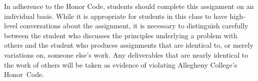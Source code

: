 In adherence to the Honor Code, students should complete this assignment on an individual basis. While it is appropriate
for students in this class to have high-level conversations about the assignment, it is necessary to distinguish
carefully between the student who discusses the principles underlying a problem with others and the student who produces
assignments that are identical to, or merely variations on, someone else's work. Any deliverables that are nearly
identical to the work of others will be taken as evidence of violating Allegheny College's \mbox{Honor Code}.



